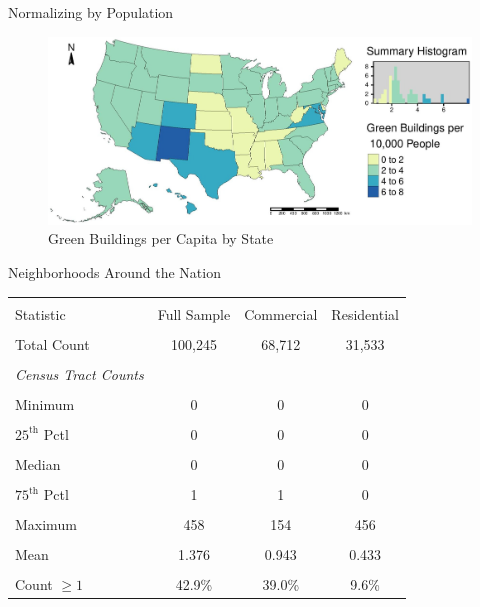 \documentclass[11pt]{beamer}
\begin{document}
\begin{frame}{Normalizing by Population}

\begin{figure}
\caption{Green Buildings per Capita by State}
	\includegraphics[width=\linewidth]{usCountsCapita.jpg}
\end{figure}

\end{frame}


\begin{frame}{Neighborhoods Around the Nation}

\begin{minipage}{\textwidth}
\small
\centering
\begin{tabular}{l c c c}
\hline\hline\\ [-1.8ex]
Statistic & Full Sample & Commercial & Residential \\ 
\hline \\ [-1.8ex]
Total Count & 100,245 & 68,712 & 31,533\\ \\ [-1.8ex]
\textit{Census Tract Counts} \\ \\ [-1.8ex]
\quad Minimum & 0 & 0 & 0\\ \\ [-1.8ex]
\quad $25^\text{th}$ Pctl & 0 & 0 & 0\\ \\ [-1.8ex]
\quad Median & 0 & 0 & 0\\ \\ [-1.8ex]
\quad $75^\text{th}$ Pctl & 1 & 1 & 0\\ \\ [-1.8ex]
\quad Maximum & 458 & 154 & 456\\ \\ [-1.8ex]
\quad Mean & 1.376 & 0.943 & 0.433\\ \\ [-1.8ex]
\quad Count $\geq 1$ & 42.9\% & 39.0\% & 9.6\%\\
\hline
\end{tabular}
\end{minipage}


\end{frame}
\end{document}
